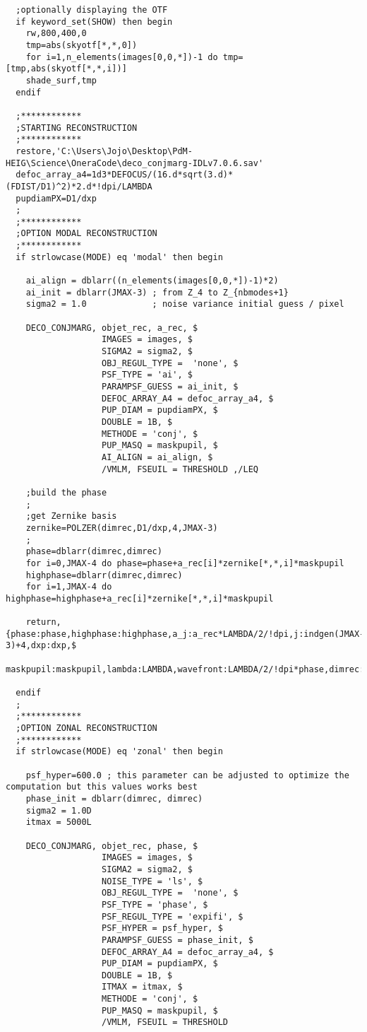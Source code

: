 \begin{lstlisting}
  ;optionally displaying the OTF
  if keyword_set(SHOW) then begin
    rw,800,400,0
    tmp=abs(skyotf[*,*,0])
    for i=1,n_elements(images[0,0,*])-1 do tmp=[tmp,abs(skyotf[*,*,i])]
    shade_surf,tmp
  endif

  ;************
  ;STARTING RECONSTRUCTION
  ;************
  restore,'C:\Users\Jojo\Desktop\PdM-HEIG\Science\OneraCode\deco_conjmarg-IDLv7.0.6.sav'
  defoc_array_a4=1d3*DEFOCUS/(16.d*sqrt(3.d)*(FDIST/D1)^2)*2.d*!dpi/LAMBDA
  pupdiamPX=D1/dxp
  ;
  ;************
  ;OPTION MODAL RECONSTRUCTION
  ;************
  if strlowcase(MODE) eq 'modal' then begin

    ai_align = dblarr((n_elements(images[0,0,*])-1)*2)
    ai_init = dblarr(JMAX-3) ; from Z_4 to Z_{nbmodes+1}
    sigma2 = 1.0             ; noise variance initial guess / pixel

    DECO_CONJMARG, objet_rec, a_rec, $
                   IMAGES = images, $
                   SIGMA2 = sigma2, $ 
                   OBJ_REGUL_TYPE =  'none', $
                   PSF_TYPE = 'ai', $
                   PARAMPSF_GUESS = ai_init, $
                   DEFOC_ARRAY_A4 = defoc_array_a4, $
                   PUP_DIAM = pupdiamPX, $
                   DOUBLE = 1B, $
                   METHODE = 'conj', $
                   PUP_MASQ = maskpupil, $
                   AI_ALIGN = ai_align, $
                   /VMLM, FSEUIL = THRESHOLD ,/LEQ

    ;build the phase
    ;
    ;get Zernike basis
    zernike=POLZER(dimrec,D1/dxp,4,JMAX-3)
    ;
    phase=dblarr(dimrec,dimrec)
    for i=0,JMAX-4 do phase=phase+a_rec[i]*zernike[*,*,i]*maskpupil
    highphase=dblarr(dimrec,dimrec)
    for i=1,JMAX-4 do highphase=highphase+a_rec[i]*zernike[*,*,i]*maskpupil

    return,{phase:phase,highphase:highphase,a_j:a_rec*LAMBDA/2/!dpi,j:indgen(JMAX-3)+4,dxp:dxp,$
            maskpupil:maskpupil,lambda:LAMBDA,wavefront:LAMBDA/2/!dpi*phase,dimrec:n_elements(phase[*,0])}

  endif
  ;
  ;************
  ;OPTION ZONAL RECONSTRUCTION
  ;************
  if strlowcase(MODE) eq 'zonal' then begin

    psf_hyper=600.0 ; this parameter can be adjusted to optimize the computation but this values works best
    phase_init = dblarr(dimrec, dimrec)
    sigma2 = 1.0D
    itmax = 5000L

    DECO_CONJMARG, objet_rec, phase, $
                   IMAGES = images, $
                   SIGMA2 = sigma2, $
                   NOISE_TYPE = 'ls', $ 
                   OBJ_REGUL_TYPE =  'none', $
                   PSF_TYPE = 'phase', $
                   PSF_REGUL_TYPE = 'expifi', $
                   PSF_HYPER = psf_hyper, $
                   PARAMPSF_GUESS = phase_init, $ 
                   DEFOC_ARRAY_A4 = defoc_array_a4, $
                   PUP_DIAM = pupdiamPX, $
                   DOUBLE = 1B, $
                   ITMAX = itmax, $
                   METHODE = 'conj', $
                   PUP_MASQ = maskpupil, $
                   /VMLM, FSEUIL = THRESHOLD


\end{lstlisting}

